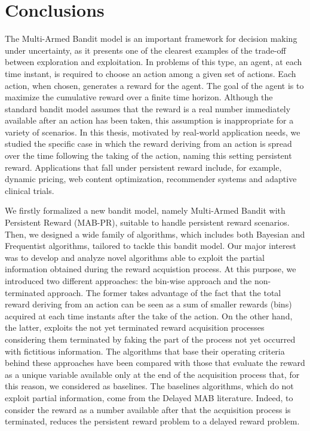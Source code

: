 \chapter{Conclusions}\label{C6}
The Multi-Armed Bandit model is an important framework for decision making under uncertainty, as it presents one of the clearest examples of the trade-off between exploration and exploitation. In problems of this type, an agent, at each time instant, is required to choose an action among a given set of actions. Each action, when chosen, generates a reward for the agent. The goal of the agent is to maximize the cumulative reward over a finite time horizon. Although the standard bandit model assumes that the reward is a real number immediately available after an action has been taken, this assumption is inappropriate for a variety of scenarios. In this thesis, motivated by real-world application needs, we studied the specific case in which the reward deriving from an action is spread over the time following the taking of the action, naming this setting persistent reward. Applications that fall under persistent reward include, for example, dynamic pricing, web content optimization, recommender systems and adaptive clinical trials.

We firstly formalized a new bandit model, namely Multi-Armed Bandit with Persistent Reward (MAB-PR), suitable to handle persistent reward scenarios. Then, we designed a wide family of algorithms, which includes both Bayesian and Frequentist algorithms, tailored to tackle this bandit model. Our major interest was to develop and analyze novel algorithms able to exploit the partial information obtained during the reward acquistion process. At this purpose, we introduced two different approaches: the bin-wise approach and the non-terminated approach. The former takes advantage of the fact that the total reward deriving from an action can be seen as a sum of smaller rewards (bins) acquired at each time instants after the take of the action. On the other hand, the latter, exploits the not yet terminated reward acquisition processes considering them terminated by faking the part of the process not yet occurred with fictitious information. The algorithms that base their operating criteria behind these approaches have been compared with those that evaluate the reward as a unique variable available only at the end of the acquisition process that, for this reason, we considered as baselines. The baselines algorithms, which do not exploit partial information, come from the Delayed MAB literature. Indeed, to consider the reward as a number available after that the acquisition process is terminated, reduces the persistent reward problem to a delayed reward problem.


